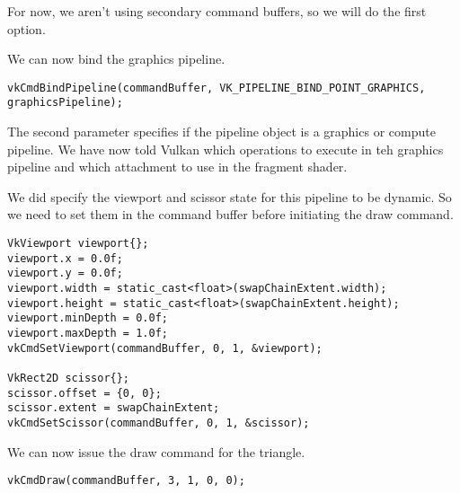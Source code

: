 \par For now, we aren't using secondary command buffers, so we will do the first option.

\par We can now bind the graphics pipeline.

\begin{center}
\begin{minipage}{0.95\linewidth}
\begin{lstlisting}
vkCmdBindPipeline(commandBuffer, VK_PIPELINE_BIND_POINT_GRAPHICS, graphicsPipeline);
\end{lstlisting}
\end{minipage}
\end{center}

\par The second parameter specifies if the pipeline object is a graphics or compute pipeline. We have now told Vulkan which operations to execute in teh graphics pipeline and which attachment to use in the fragment shader.

\par We did specify the viewport and scissor state for this pipeline to be dynamic. So we need to set them in the command buffer before initiating the draw command.

\begin{center}
\begin{minipage}{0.95\linewidth}
\begin{lstlisting}
VkViewport viewport{};
viewport.x = 0.0f;
viewport.y = 0.0f;
viewport.width = static_cast<float>(swapChainExtent.width);
viewport.height = static_cast<float>(swapChainExtent.height);
viewport.minDepth = 0.0f;
viewport.maxDepth = 1.0f;
vkCmdSetViewport(commandBuffer, 0, 1, &viewport);

VkRect2D scissor{};
scissor.offset = {0, 0};
scissor.extent = swapChainExtent;
vkCmdSetScissor(commandBuffer, 0, 1, &scissor);
\end{lstlisting}
\end{minipage}
\end{center}

\par We can now issue the draw command for the triangle.

\begin{center}
\begin{minipage}{0.95\linewidth}
\begin{lstlisting}
vkCmdDraw(commandBuffer, 3, 1, 0, 0);
\end{lstlisting}
\end{minipage}
\end{center}


